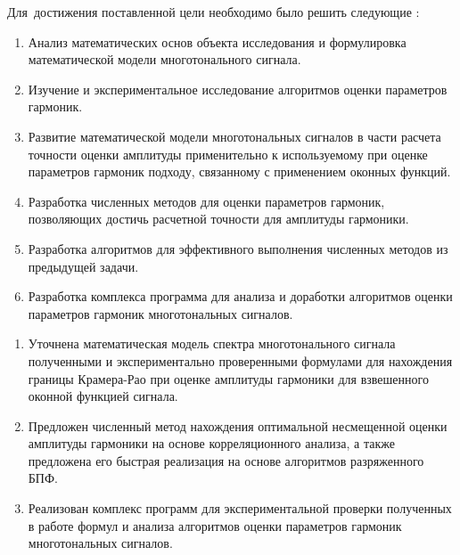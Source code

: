 Для~достижения поставленной цели необходимо было решить следующие {\tasks}:
\begin{enumerate}
  \item Анализ математических основ объекта исследования и формулировка математической модели многотонального сигнала.
  
  \item Изучение и экспериментальное исследование алгоритмов оценки параметров гармоник.
  
  \item Развитие математической модели многотональных сигналов в части расчета точности оценки амплитуды применительно к используемому при оценке параметров гармоник подходу, связанному с применением оконных функций.
  
  \item Разработка численных методов для оценки параметров гармоник, позволяющих достичь расчетной точности для амплитуды гармоники.
  
  \item Разработка алгоритмов для эффективного выполнения численных методов из предыдущей задачи.
  
  \item Разработка комплекса программа для анализа и доработки алгоритмов оценки параметров гармоник многотональных сигналов.
\end{enumerate}


{\novelty}
 
\begin{enumerate}
  \item Уточнена математическая модель спектра многотонального сигнала полученными и экспериментально проверенными формулами для нахождения границы Крамера-Рао при оценке амплитуды гармоники для взвешенного оконной функцией сигнала.
  
  \item Предложен численный метод нахождения оптимальной несмещенной оценки амплитуды гармоники на основе корреляционного анализа, а также предложена его быстрая реализация на основе алгоритмов разряженного БПФ.
  
  \item Реализован комплекс программ для экспериментальной проверки полученных в работе формул и анализа алгоритмов оценки параметров гармоник многотональных сигналов.
\end{enumerate}


